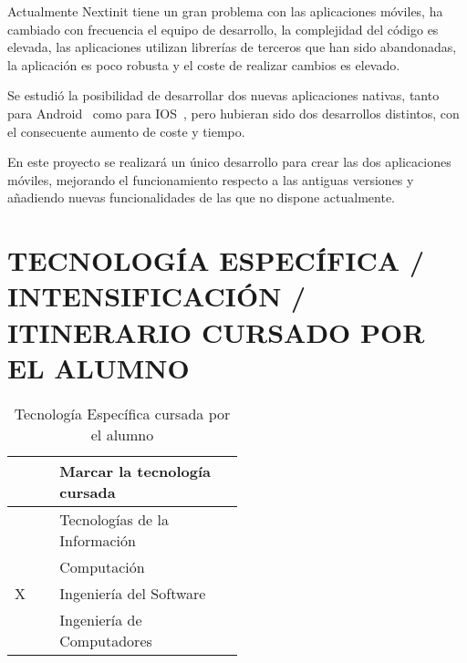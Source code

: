 \documentclass{pre-tfg}
\begin{document}
    Actualmente Nextinit tiene un gran problema con las aplicaciones móviles, ha cambiado con frecuencia el equipo de
    desarrollo, la complejidad del código es elevada, las aplicaciones utilizan librerías de terceros que han sido
    abandonadas, la aplicación es poco robusta y el coste de realizar cambios es elevado.

    Se estudió la posibilidad de desarrollar dos nuevas aplicaciones nativas, tanto para Android~\cite{NEXTAN} como
    para IOS~\cite{NEXTIP}, pero hubieran sido dos desarrollos distintos, con el consecuente aumento de coste y tiempo.

    En este proyecto se realizará un único desarrollo para crear las dos aplicaciones móviles, mejorando el
    funcionamiento respecto a las antiguas versiones y añadiendo nuevas funcionalidades de las que no dispone
    actualmente.

    \section{TECNOLOGÍA ESPECÍFICA / INTENSIFICACIÓN / ITINERARIO CURSADO POR EL ALUMNO}


    \begin{table}[hp]
        \centering
        \caption{Tecnología Específica cursada por el alumno}
        \label{tab:tec-especifica}

        \begin{tabular}{p{0.1\linewidth}p{0.4\linewidth}}
            & \textbf{Marcar la tecnología cursada} \\
            \hline
            & Tecnologías de la Información \\
            & Computación \\
            X & Ingeniería del Software \\
            & Ingeniería de Computadores \\
            \hline
        \end{tabular}
    \end{table}


\end{document}
